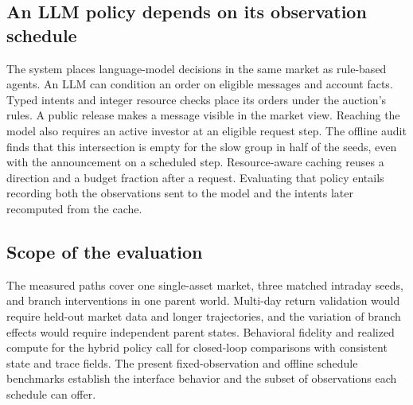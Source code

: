 \subsection{An LLM policy depends on its observation schedule}

The system places language-model decisions in the same market as rule-based agents. An LLM can condition an order on eligible messages and account facts. Typed intents and integer resource checks place its orders under the auction's rules. A public release makes a message visible in the market view. Reaching the model also requires an active investor at an eligible request step. The offline audit finds that this intersection is empty for the slow group in half of the seeds, even with the announcement on a scheduled step. Resource-aware caching reuses a direction and a budget fraction after a request. Evaluating that policy entails recording both the observations sent to the model and the intents later recomputed from the cache.

\subsection{Scope of the evaluation}

The measured paths cover one single-asset market, three matched intraday seeds, and branch interventions in one parent world. Multi-day return validation would require held-out market data and longer trajectories, and the variation of branch effects would require independent parent states. Behavioral fidelity and realized compute for the hybrid policy call for closed-loop comparisons with consistent state and trace fields. The present fixed-observation and offline schedule benchmarks establish the interface behavior and the subset of observations each schedule can offer.
